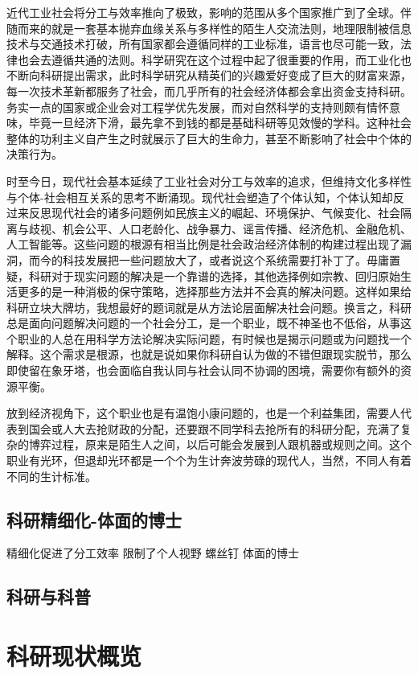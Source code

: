 \documentclass[]{book}
\begin{document}
近代工业社会将分工与效率推向了极致，影响的范围从多个国家推广到了全球。伴随而来的就是一套基本抛弃血缘关系与多样性的陌生人交流法则，地理限制被信息技术与交通技术打破，所有国家都会遵循同样的工业标准，语言也尽可能一致，法律也会去遵循共通的法则。科学研究在这个过程中起了很重要的作用，而工业化也不断向科研提出需求，此时科学研究从精英们的兴趣爱好变成了巨大的财富来源，每一次技术革新都服务了社会，而几乎所有的社会经济体都会拿出资金支持科研。务实一点的国家或企业会对工程学优先发展，而对自然科学的支持则颇有情怀意味，毕竟一旦经济下滑，最先拿不到钱的都是基础科研等见效慢的学科。这种社会整体的功利主义自产生之时就展示了巨大的生命力，甚至不断影响了社会中个体的决策行为。

时至今日，现代社会基本延续了工业社会对分工与效率的追求，但维持文化多样性与个体-社会相互关系的思考不断涌现。现代社会塑造了个体认知，个体认知却反过来反思现代社会的诸多问题例如民族主义的崛起、环境保护、气候变化、社会隔离与歧视、机会公平、人口老龄化、战争暴力、谣言传播、经济危机、金融危机、人工智能等。这些问题的根源有相当比例是社会政治经济体制的构建过程出现了漏洞，而今的科技发展把一些问题放大了，或者说这个系统需要打补丁了。毋庸置疑，科研对于现实问题的解决是一个靠谱的选择，其他选择例如宗教、回归原始生活更多的是一种消极的保守策略，选择那些方法并不会真的解决问题。这样如果给科研立块大牌坊，我想最好的题词就是从方法论层面解决社会问题。换言之，科研总是面向问题解决问题的一个社会分工，是一个职业，既不神圣也不低俗，从事这个职业的人总在用科学方法论解决实际问题，有时候也是揭示问题或为问题找一个解释。这个需求是根源，也就是说如果你科研自认为做的不错但跟现实脱节，那么即使留在象牙塔，也会面临自我认同与社会认同不协调的困境，需要你有额外的资源平衡。

放到经济视角下，这个职业也是有温饱小康问题的，也是一个利益集团，需要人代表到国会或人大去抢财政的分配，还要跟不同学科去抢所有的科研分配，充满了复杂的博弈过程，原来是陌生人之间，以后可能会发展到人跟机器或规则之间。这个职业有光环，但退却光环都是一个个为生计奔波劳碌的现代人，当然，不同人有着不同的生计标准。

\section{科研精细化-体面的博士}\label{-}

精细化促进了分工效率 限制了个人视野 螺丝钉 体面的博士

\section{科研与科普}

\chapter{科研现状概览}\label{view}
\end{document}
